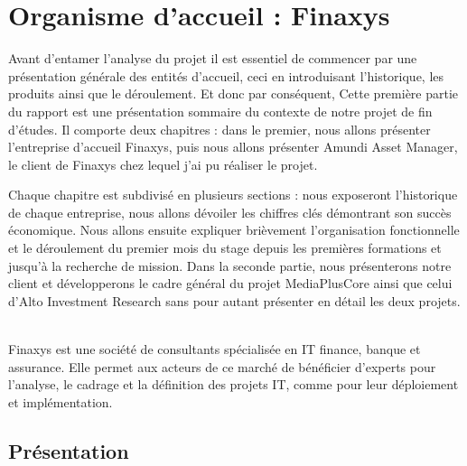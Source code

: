\setlength{\parskip}{0.8em}



\chapter{Organisme d’accueil : Finaxys}

\label{Chapter01}

\par
Avant d'entamer l’analyse du projet il est essentiel de commencer par une présentation générale des entités d’accueil, ceci en introduisant l'historique, les produits ainsi que le déroulement. Et donc par conséquent, Cette première partie du rapport est une présentation sommaire du contexte de notre projet de fin d’études. Il comporte deux chapitres : dans le premier, nous allons présenter l’entreprise d’accueil Finaxys, puis nous allons présenter Amundi Asset Manager, le client de Finaxys chez lequel j'ai pu réaliser le projet.
\par Chaque chapitre est subdivisé en plusieurs sections : nous exposeront l'historique de chaque entreprise, nous allons dévoiler les chiffres clés démontrant son succès économique. Nous allons ensuite expliquer brièvement l'organisation fonctionnelle et le déroulement du premier mois du stage depuis les premières formations et jusqu'à la recherche de mission. Dans la seconde partie, nous présenterons notre client et développerons le cadre général du projet MediaPlusCore ainsi que celui d'Alto Investment Research sans pour autant présenter en détail les deux projets.
\\~\\
\par Finaxys est une société de consultants spécialisée en IT finance, banque et assurance. Elle permet aux acteurs de ce marché de bénéficier d’experts pour l’analyse, le cadrage et la définition des projets IT, comme pour leur déploiement et implémentation.

\section{Présentation}

